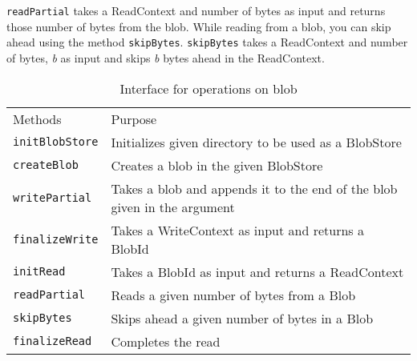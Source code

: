 \texttt{readPartial} takes a ReadContext and number of bytes as input and returns those number of bytes from the blob.
While reading from a blob, you can skip ahead using the method \texttt{skipBytes}. \texttt{skipBytes} takes a ReadContext and number of bytes, \textit{b} as input and skips \textit{b} bytes ahead in the ReadContext.

\begin{table}[hbt]
\caption{Interface for operations on blob}
\label{tab:interface-blob}
\begin{center}
  \begin{tabularx}{0.91\textwidth}{lX}
    \hline\noalign{\smallskip}
    Methods & Purpose \\
    \noalign{\smallskip}
    \hline
    \noalign{\smallskip}
    \texttt{initBlobStore} & Initializes given directory to be used as a BlobStore \\
    \texttt{createBlob} & Creates a blob in the given BlobStore\\
    \texttt{writePartial} & Takes a blob and appends it to the end of the blob given in the argument\\
    \texttt{finalizeWrite} & Takes a WriteContext as input and returns a BlobId \\
    \texttt{initRead} & Takes a BlobId as input and returns a ReadContext \\
    \texttt{readPartial} & Reads a given number of bytes from a Blob \\
    \texttt{skipBytes} & Skips ahead a given number of bytes in a Blob \\
    \texttt{finalizeRead} & Completes the read \\
    \hline
  \end{tabularx}
\end{center}
\end{table}


